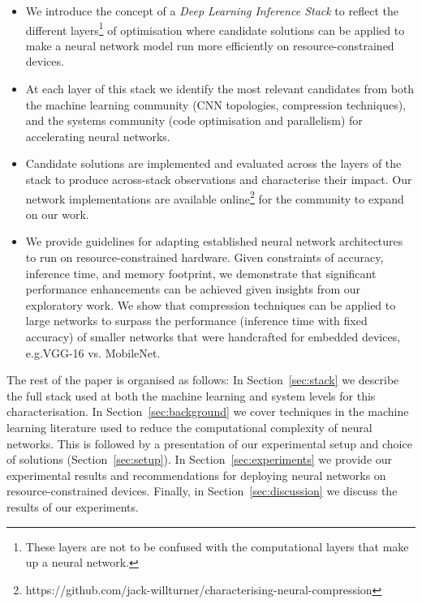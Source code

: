 \documentclass[conference]{IEEEtran}
\begin{document}
\begin{itemize}
\item We introduce the concept of a \textit{Deep Learning Inference Stack} to reflect the different layers\footnote{These layers are not to be confused with the computational layers that make up a neural network.} of optimisation where candidate solutions can be applied to make a neural network model run more efficiently on resource-constrained devices.

\item At each layer of this stack we identify the most relevant candidates from both the machine learning community (CNN topologies, compression techniques), and the systems community (code optimisation and parallelism) for accelerating neural networks.

\item Candidate solutions are implemented and evaluated across the layers of the stack to produce across-stack observations and characterise their impact. Our network implementations are available online\footnote{https://github.com/jack-willturner/characterising-neural-compression} for the community to expand on our work.

\item We provide guidelines for adapting established neural network architectures to run on resource-constrained hardware. Given constraints of accuracy, inference time, and memory footprint, we demonstrate that significant performance enhancements can be achieved given insights from our exploratory work. We show that compression techniques can be applied to large networks to surpass the performance (inference time with fixed accuracy) of smaller networks that were handcrafted for embedded devices, e.g.\compressed VGG-16 vs. MobileNet.


\end{itemize}
The rest of the paper is organised as follows: In Section~\ref{sec:stack} we describe the full stack used at both the machine learning and system levels for this characterisation. In Section~\ref{sec:background} we cover techniques in the machine learning literature used to reduce the computational complexity of neural networks. This is followed by a presentation of our experimental setup and choice of solutions (Section~\ref{sec:setup}). In Section~\ref{sec:experiments} we provide our experimental results and recommendations for deploying neural networks on resource-constrained devices. Finally, in Section~\ref{sec:discussion} we discuss the results of our experiments.
\end{document}
